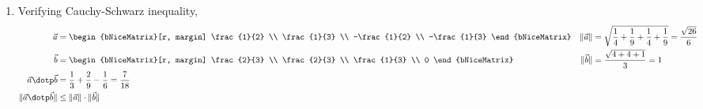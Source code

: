 \begin{enumerate}
    \item Verifying Cauchy-Schwarz inequality,
          \begin{align}
              \vec{a}                             & = \begin{bNiceMatrix}[r, margin]
                                                          \frac{1}{2}  \\ \frac{1}{3} \\
                                                          -\frac{1}{2} \\ -\frac{1}{3}
                                                      \end{bNiceMatrix}  &
              \lVert \vec{a} \rVert               & = \sqrt{\frac{1}{4} + \frac{1}{9}
              + \frac{1}{4} + \frac{1}{9}} = \frac{\sqrt{26}}{6}                      \\
              \vec{b}                             & = \begin{bNiceMatrix}[r, margin]
                                                          \frac{2}{3} \\ \frac{2}{3} \\
                                                          \frac{1}{3} \\ 0
                                                      \end{bNiceMatrix}  &
              \lVert \vec{b} \rVert               & = \frac{\sqrt{4 + 4 + 1}}{3} = 1  \\
              \vec{a} \dotp \vec{b}               & = \frac{1}{3} +
              \frac{2}{9} -\frac{1}{6} = \frac{7}{18}                                 \\
              \lVert \vec{a} \dotp \vec{b} \rVert & \leq \lVert \vec{a} \rVert
              \cdot \lVert \vec{b} \rVert
          \end{align}


\end{enumerate}
